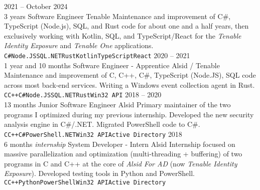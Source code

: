 \documentclass[8pt]{developercv} %
\begin{document}
\begin{entrylist}
	\entry
		{2021 -- October 2024\\\footnotesize{3 years}}
		{Software Engineer}
		{Tenable}
		{
			Maintenance and improvement of C\#, TypeScript (Node.js), SQL, and Rust code for about one and a half years, then exclusively working with Kotlin,
			SQL, and TypeScript/React for the \emph{Tenable Identity Exposure} and \emph{Tenable One} applications.\\
			\texttt{C\#}\slashsep\texttt{Node.JS}\slashsep\texttt{SQL}\slashsep\texttt{.NET}\slashsep\texttt{Rust}\slashsep\texttt{Kotlin}\slashsep\texttt{TypeScript}\slashsep\texttt{React}
		}
	\entry
		{2020 -- 2021\\\footnotesize{1 year and 10 months}}
		{Software Engineer - Apprentice}
		{Alsid / Tenable}
		{
			Maintenance and improvement of C, C++, C\#, TypeScript (Node.JS), SQL code across most back-end services. Writing a Windows event collection agent in Rust\footnotemark[1].\\
			\texttt{C}\slashsep\texttt{C++}\slashsep\texttt{C\#}\slashsep\texttt{Node.JS}\slashsep\texttt{SQL}\slashsep\texttt{.NET}\slashsep\texttt{Rust}\slashsep\texttt{Win32 API}
		}
	\entry
		{2018 -- 2020\\\footnotesize{13 months}}
		{Junior Software Engineer}
		{Alsid}
		{
			Primary maintainer of the two programs I optimized during my previous internship. Developed the new security analysis engine in C\#/.NET. Migrated PowerShell code to C\#.\\
			\texttt{C}\slashsep\texttt{C++}\slashsep\texttt{C\#}\slashsep\texttt{PowerShell}\slashsep\texttt{.NET}\slashsep\texttt{Win32 API}\slashsep\texttt{Active Directory}
		}
	\entry
		{2018\\\footnotesize{6 months \emph{internship}}}
		{System Developer  - Intern}
		{Alsid}
		{
			Internship focused on massive parallelization and optimization (multi-threading + buffering) of two programs in C and C++ at the core of \emph{Alsid For AD} (now \emph{Tenable Identity Exposure}).
			Developed testing tools in Python and PowerShell.\\
			\texttt{C}\slashsep\texttt{C++}\slashsep\texttt{Python}\slashsep\texttt{PowerShell}\slashsep\texttt{Win32 API}\slashsep\texttt{Active Directory}
		}
\end{entrylist}

\vfill %
\end{document}
